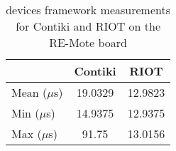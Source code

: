 \begin{table}[!ht]
  \centering
  \begin{tabular}{l|c|c}
                & Contiki  & RIOT \\ \hline
  Mean ($\mu$s) & 19.0329  & 12.9823 \\
  Min  ($\mu$s) & 14.9375  & 12.9375 \\
  Max  ($\mu$s) & 91.75    & 13.0156
  \end{tabular}
  \caption{devices framework measurements for Contiki and RIOT on the RE-Mote board}
  \label{tab:devices-framework-remote}
  \end{table}